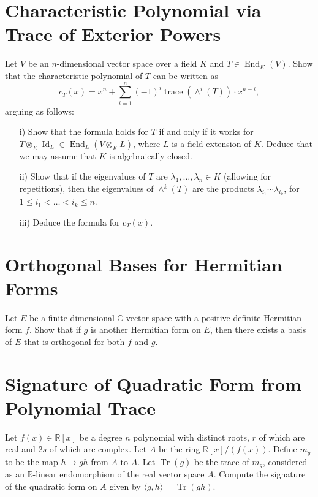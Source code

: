 \documentclass[lang=cn,11pt]{template}
\begin{document}
\section{Characteristic Polynomial via Trace of Exterior Powers}
Let \( V \) be an \( n \)-dimensional vector space over a field \( K \) and \( T \in \operatorname{End}_K(V) \). Show that the characteristic polynomial of \( T \) can be written as
\[
c_T(x) = x^n + \sum_{i=1}^n (-1)^i \operatorname{trace}(\wedge^i(T)) \cdot x^{n-i},
\]
arguing as follows:
\begin{itemize}
    \item[i)] Show that the formula holds for \( T \) if and only if it works for \( T \otimes_K \operatorname{Id}_L \in \operatorname{End}_L(V \otimes_K L) \), where \( L \) is a field extension of \( K \). Deduce that we may assume that \( K \) is algebraically closed.
    \item[ii)] Show that if the eigenvalues of \( T \) are \( \lambda_1, \dots, \lambda_n \in K \) (allowing for repetitions), then the eigenvalues of \( \wedge^k(T) \) are the products \( \lambda_{i_1} \cdots \lambda_{i_k} \), for \( 1 \leq i_1 < \dots < i_k \leq n \).
    \item[iii)] Deduce the formula for \( c_T(x) \).
\end{itemize}

\section{Orthogonal Bases for Hermitian Forms}
Let \( E \) be a finite-dimensional \( \mathbb{C} \)-vector space with a positive definite Hermitian form \( f \). Show that if \( g \) is another Hermitian form on \( E \), then there exists a basis of \( E \) that is orthogonal for both \( f \) and \( g \).

\section{Signature of Quadratic Form from Polynomial Trace}
Let \( f(x) \in \mathbb{R}[x] \) be a degree \( n \) polynomial with distinct roots, \( r \) of which are real and \( 2s \) of which are complex. Let \( A \) be the ring \( \mathbb{R}[x] / (f(x)) \). Define \( m_g \) to be the map \( h \mapsto gh \) from \( A \) to \( A \). Let \( \operatorname{Tr}(g) \) be the trace of \( m_g \), considered as an \( \mathbb{R} \)-linear endomorphism of the real vector space \( A \). Compute the signature of the quadratic form on \( A \) given by \( \langle g, h \rangle = \operatorname{Tr}(gh) \).
\end{document}
